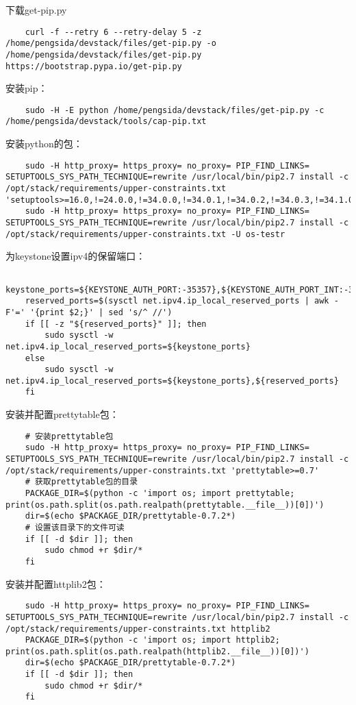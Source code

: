 \documentclass[a4paper,left=1.5cm,right=1.5cm,11pt]{article}
\begin{document}
	下载get-pip.py
	\begin{lstlisting}
	curl -f --retry 6 --retry-delay 5 -z /home/pengsida/devstack/files/get-pip.py -o /home/pengsida/devstack/files/get-pip.py https://bootstrap.pypa.io/get-pip.py
	\end{lstlisting}

	安装pip：
	\begin{lstlisting}
	sudo -H -E python /home/pengsida/devstack/files/get-pip.py -c /home/pengsida/devstack/tools/cap-pip.txt
	\end{lstlisting}

	安装python的包：
	\begin{lstlisting}
	sudo -H http_proxy= https_proxy= no_proxy= PIP_FIND_LINKS= SETUPTOOLS_SYS_PATH_TECHNIQUE=rewrite /usr/local/bin/pip2.7 install -c /opt/stack/requirements/upper-constraints.txt 'setuptools>=16.0,!=24.0.0,!=34.0.0,!=34.0.1,!=34.0.2,!=34.0.3,!=34.1.0,!=34.1.1,!=34.2.0,!=34.3.0,!=34.3.1,!=34.3.2'
	sudo -H http_proxy= https_proxy= no_proxy= PIP_FIND_LINKS= SETUPTOOLS_SYS_PATH_TECHNIQUE=rewrite /usr/local/bin/pip2.7 install -c /opt/stack/requirements/upper-constraints.txt -U os-testr
	\end{lstlisting}

	为keystone设置ipv4的保留端口：
	\begin{lstlisting}
	keystone_ports=${KEYSTONE_AUTH_PORT:-35357},${KEYSTONE_AUTH_PORT_INT:-35358}
	reserved_ports=$(sysctl net.ipv4.ip_local_reserved_ports | awk -F'=' '{print $2;}' | sed 's/^ //')
	if [[ -z "${reserved_ports}" ]]; then
        sudo sysctl -w net.ipv4.ip_local_reserved_ports=${keystone_ports}
    else
        sudo sysctl -w net.ipv4.ip_local_reserved_ports=${keystone_ports},${reserved_ports}
    fi
	\end{lstlisting}

	安装并配置prettytable包：
	\begin{lstlisting}
	# 安装prettytable包
	sudo -H http_proxy= https_proxy= no_proxy= PIP_FIND_LINKS= SETUPTOOLS_SYS_PATH_TECHNIQUE=rewrite /usr/local/bin/pip2.7 install -c /opt/stack/requirements/upper-constraints.txt 'prettytable>=0.7'
	# 获取prettytable包的目录
	PACKAGE_DIR=$(python -c 'import os; import prettytable; print(os.path.split(os.path.realpath(prettytable.__file__))[0])')
	dir=$(echo $PACKAGE_DIR/prettytable-0.7.2*)
	# 设置该目录下的文件可读
	if [[ -d $dir ]]; then
		sudo chmod +r $dir/*
	fi
	\end{lstlisting}

	安装并配置httplib2包：
	\begin{lstlisting}
	sudo -H http_proxy= https_proxy= no_proxy= PIP_FIND_LINKS= SETUPTOOLS_SYS_PATH_TECHNIQUE=rewrite /usr/local/bin/pip2.7 install -c /opt/stack/requirements/upper-constraints.txt httplib2
	PACKAGE_DIR=$(python -c 'import os; import httplib2; print(os.path.split(os.path.realpath(httplib2.__file__))[0])')
	dir=$(echo $PACKAGE_DIR/prettytable-0.7.2*)
	if [[ -d $dir ]]; then
		sudo chmod +r $dir/*
	fi
	\end{lstlisting}
\end{document}
